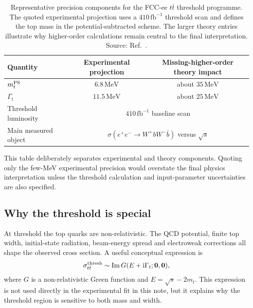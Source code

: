 \documentclass[11pt,a4paper]{article}
\newcommand{\ii}{\mathrm{i}}
\newcommand{\fb}{\mathrm{fb}}
\numberwithin{equation}{section}
\begin{document}
\begin{table}[H]
\centering
\small
\caption{Representative precision components for the FCC-ee \(t\bar t\) threshold programme. The quoted experimental projection uses a \(410\,\fb^{-1}\) threshold scan and defines the top mass in the potential-subtracted scheme. The larger theory entries illustrate why higher-order calculations remain central to the final interpretation. Source: Ref.~\cite{DefranchisTopThreshold2025}.}
\label{tab:top-threshold-benchmarks}
\begin{tabular}{@{}lcc@{}}
\toprule
Quantity & Experimental projection & Missing-higher-order theory impact \\
\midrule
\(m_t^{\rm PS}\) & \(6.8\,\mathrm{MeV}\) & about \(35\,\mathrm{MeV}\) \\
\(\Gamma_t\) & \(11.5\,\mathrm{MeV}\) & about \(25\,\mathrm{MeV}\) \\
Threshold luminosity & \multicolumn{2}{c}{\(410\,\fb^{-1}\) baseline scan} \\
Main measured object & \multicolumn{2}{c}{\(\sigma(e^+e^-\to W^+bW^-\bar b)\) versus \(\sqrt{s}\)} \\
\bottomrule
\end{tabular}
\end{table}
This table deliberately separates experimental and theory components. Quoting only the few-MeV experimental precision would overstate the final physics interpretation unless the threshold calculation and input-parameter uncertainties are also specified.


\subsection{Why the threshold is special}
At threshold the top quarks are non-relativistic. The QCD potential, finite top width, initial-state radiation, beam-energy spread and electroweak corrections all shape the observed cross section. A useful conceptual expression is
\begin{equation}
  \sigma_{t\bar t}^{\rm thresh}\sim \mathrm{Im}\,G(E+\ii\Gamma_t;\mathbf{0},\mathbf{0}),
\end{equation}
where \(G\) is a non-relativistic Green function and \(E=\sqrt{s}-2m_t\). This expression is not used directly in the experimental fit in this note, but it explains why the threshold region is sensitive to both mass and width.
\end{document}
